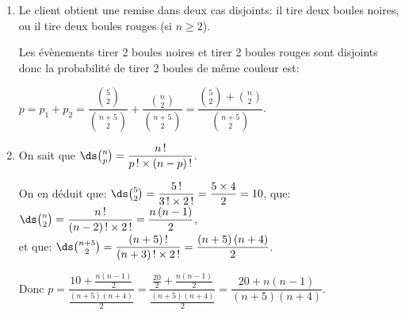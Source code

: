 \begin{enumerate}
\item 


Le client obtient une remise dans deux cas disjoints: il tire deux boules noires, ou il tire deux boules rouges (si $n\geqslant 2$).


Les évènements \og tirer 2 boules noires \fg{} et \og tirer 2 boules rouges\fg{}  sont disjoints donc la probabilité de tirer 2 boules de même couleur est:

$p=p_1+p_2= \dfrac{\binom{5}{2}}{\binom{n+5}{2}} + \dfrac{\binom{n}{2}}{\binom{n+5}{2}} = \dfrac{\binom{5}{2} +\binom{n}{2}}{\binom{n+5}{2}}$.

\item 


On sait que $\ds\binom{n}{p} = \dfrac{n\,!}{p\,! \times (n-p)\,!}$.

On en déduit que:
$\ds\binom{5}{2}=\dfrac{5\,!}{3\,! \times 2\,!}= \dfrac{5\times 4}{2}=10$,
que: $\ds\binom{n}{2}=\dfrac{n\,!}{\left (n-2\right )\,! \times 2\,!}= \dfrac{n\left (n-1\right )}{2}$,\\
et que: $\ds\binom{n+5}{2}=\dfrac{(n+5)\,!}{\left (n+3\right )\,! \times 2\,!}= \dfrac{\left (n+5\right )\left (n+4\right )}{2}$.

Donc
$p= \dfrac{10 + \frac{n\left (n-1\right )}{2}}{\frac{\left (n+5\right )\left (n+4\right )}{2}}
= \dfrac{\frac{20}{2} + \frac{n\left (n-1\right )}{2}}{\frac{\left (n+5\right )\left (n+4\right )}{2}}
=\dfrac{20+n\left (n-1\right )}{\left (n+5\right )\left (n+4\right )}$.


\end{enumerate}
